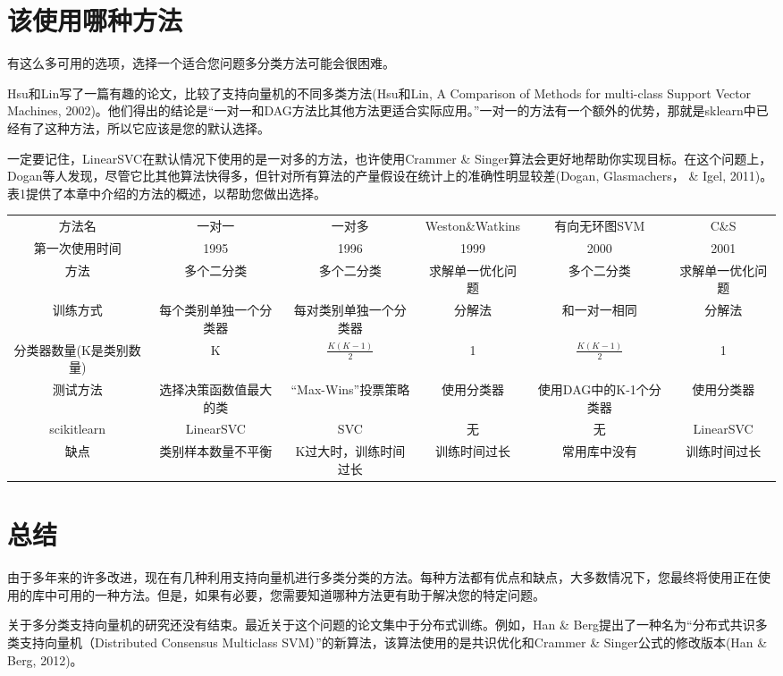 \section{该使用哪种方法}

有这么多可用的选项，选择一个适合您问题多分类方法可能会很困难。

Hsu和Lin写了一篇有趣的论文，比较了支持向量机的不同多类方法(Hsu和Lin, A Comparison of Methods for multi-class Support Vector Machines, 2002)。他们得出的结论是“一对一和DAG方法比其他方法更适合实际应用。”一对一的方法有一个额外的优势，那就是sklearn中已经有了这种方法，所以它应该是您的默认选择。

一定要记住，LinearSVC在默认情况下使用的是一对多的方法，也许使用Crammer \& Singer算法会更好地帮助你实现目标。在这个问题上，Dogan等人发现，尽管它比其他算法快得多，但针对所有算法的产量假设在统计上的准确性明显较差(Dogan, Glasmachers， \& Igel, 2011)。表1提供了本章中介绍的方法的概述，以帮助您做出选择。

\begin{tabular}{cccccc}
    方法名 & 一对一 & 一对多 & Weston\&Watkins & 有向无环图SVM & C\&S \\

    第一次使用时间 & 1995 & 1996 & 1999 & 2000 & 2001 \\
方法 & 多个二分类 & 多个二分类 & 求解单一优化问题 & 多个二分类 & 求解单一优化问题 \\
训练方式 & 每个类别单独一个分类器 & 每对类别单独一个分类器 & 分解法 & 和一对一相同 & 分解法 \\
分类器数量(K是类别数量) & K & $\frac{K(K-1)}{2}$ & 1 & $\frac{K(K-1)}{2}$ & 1 \\
测试方法 & 选择决策函数值最大的类 & “Max-Wins”投票策略 & 使用分类器 & 使用DAG中的K-1个分类器 & 使用分类器 \\
scikitlearn & LinearSVC & SVC & 无 & 无 & LinearSVC \\
缺点 & 类别样本数量不平衡 & K过大时，训练时间过长 & 训练时间过长 & 常用库中没有 & 训练时间过长 \\
\end{tabular}
\section{总结}

由于多年来的许多改进，现在有几种利用支持向量机进行多类分类的方法。每种方法都有优点和缺点，大多数情况下，您最终将使用正在使用的库中可用的一种方法。但是，如果有必要，您需要知道哪种方法更有助于解决您的特定问题。

关于多分类支持向量机的研究还没有结束。最近关于这个问题的论文集中于分布式训练。例如，Han \& Berg提出了一种名为“分布式共识多类支持向量机（Distributed Consensus Multiclass SVM）”的新算法，该算法使用的是共识优化和Crammer \& Singer公式的修改版本(Han \& Berg, 2012)。

